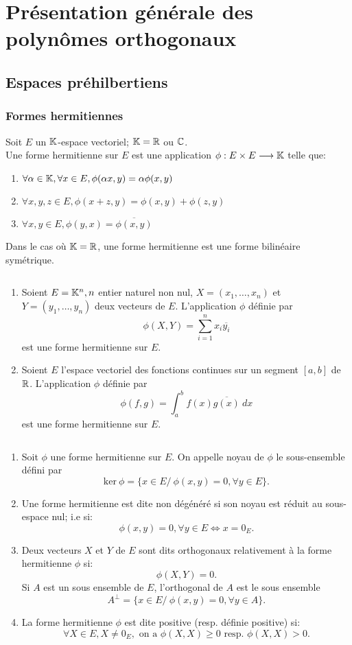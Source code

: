 \chapter{Pr\'{e}sentation g\'{e}n\'{e}rale des polyn\^{o}mes orthogonaux}

\section{Espaces préhilbertiens}

\subsection{Formes hermitiennes}
Soit $ E $ un $\mathbb K$-espace vectoriel; $\mathbb K=\mathbb R$ ou $\mathbb C$.
\bdfn
$ $\\
Une forme hermitienne sur $E$ est une application $ \displaystyle{ \phi: E \times E\longrightarrow \mathbb K}$ telle que:
\begin{enumerate}
\item $ \forall \alpha \in \mathbb K, \forall x \in E, \phi( \alpha x,y ) = \alpha \phi( x,y )$
\item $ \forall x,y,z \in E, \phi( x+z,y ) = \phi( x,y ) + \phi( z,y )$
\item $ \forall x,y \in E, \phi( y,x ) = \overline{\phi( x,y )}$
\end{enumerate}
$ $\\
Dans le cas où $\mathbb K = \mathbb R$, une forme hermitienne est une forme bilinéaire symétrique.
\edfn

\bex
$ $
\begin{enumerate}
\item Soient $E=\mathbb K^n, n$ entier naturel non nul, $X=(x_1,\dots,x_n)$ et $Y=(y_1,\dots,y_n)$ deux vecteurs de $E$. L'application $\phi$ définie par $$\phi(X,Y)=\sum\limits_{i=1}^n x_i \overline{y_i}$$ est une forme hermitienne sur $E$.
\item Soient $E$ l'espace vectoriel des fonctions continues sur un segment $[a,b]$ de $\mathbb R$. L'application $\phi$ définie par $$\phi(f,g)=\int_a^b{ f(x)\overline{g(x)}\ dx}$$ est une forme hermitienne sur $E$.
\end{enumerate}
\eex

\bdfn
$ $
\begin{enumerate}
\item Soit $\phi$ une forme hermitienne sur $E$. On appelle noyau de $\phi$ le sous-ensemble défini par 
$$\text{ker}\ \phi = \{x\in E/ \ \phi(x,y)=0, \forall y \in E \}.$$
\item Une forme hermitienne est dite non dégénéré si son noyau est réduit au sous-espace nul; i.e si: 
$$\phi(x,y)=0, \forall y \in E \Leftrightarrow x=0_E.$$
\item Deux vecteurs $X$ et $Y$ de $E$ sont dits orthogonaux relativement à la forme hermitienne $\phi$ si:
$$\phi(X,Y)=0.$$
Si $A$ est un sous ensemble de $E$, l'orthogonal de $A$ est le sous ensemble $$A^\perp = \{x \in E/ \ \phi(x,y)=0, \forall y\in A\}.$$
\item La forme hermitienne $\phi$ est dite positive (resp. définie positive) si:
$$\forall X \in E, X \neq 0_E, \text{ on a } \phi(X,X) \geqslant 0 \text{ resp. } \phi(X,X)>0.$$
\end{enumerate}
\edfn

